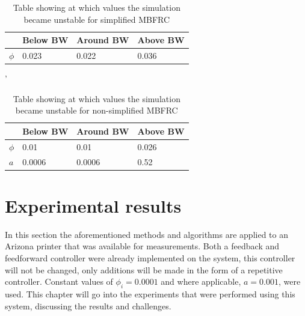 \documentclass[journal]{IEEEtran}
\begin{document}
\begin{table}[]
\centering
\caption{Table showing at which values the simulation became unstable for simplified MBFRC}
\label{tab:stabilitySimp}
\begin{tabular}{|l|l|l|l|}
\hline
       & Below BW & Around BW & Above BW \\ \hline
$\phi$ & 0.023     & 0.022      & 0.036    \\ \hline
\end{tabular}
\end{table}

\begin{table}[]
\centering'
\caption{Table showing at which values the simulation became unstable for non-simplified MBFRC}
\label{tab:stabilityNonSimp}
\begin{tabular}{|l|l|l|l|}
\hline
       & Below BW & Around BW & Above BW \\ \hline
$\phi$ & 0.01     & 0.01      & 0.026    \\ \hline
$a$    & 0.0006   & 0.0006    & 0.52     \\ \hline
\end{tabular}
\end{table}
\section{Experimental results}\label{sec:Exp_Res}
In this section the aforementioned methods and algorithms are applied to an Arizona printer \cite{Challenge_description} that was available for measurements. Both a feedback and feedforward controller were already implemented on the system, this controller will not be changed, only additions will be made in the form of a repetitive controller. Constant values of $\phi_i=0.0001$ and where applicable, $a=0.001$, were used. This chapter will go into the experiments that were performed using this system, discussing the results and challenges.
\end{document}
